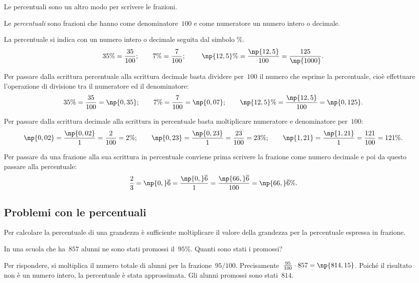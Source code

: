 Le percentuali sono un altro modo per scrivere le frazioni.

\begin{definizione}
Le \emph{percentuali} sono frazioni che hanno come denominatore~$100$ e come numeratore un numero intero o decimale.
\end{definizione}

La percentuale si indica con un numero intero o decimale seguita dal simbolo \%.
\[35\%=\frac{35}{100};\qquad7\%=\frac{7}{100};\qquad~\np{12,5}\%=\frac{\np{12,5}}{100}=\frac{125}{\np{1000}}.\]

Per passare dalla scrittura percentuale alla scrittura decimale basta dividere per~$100$ il
numero che esprime la percentuale, cioè effettuare l'operazione di divisione tra il numeratore ed il denominatore:
\[35\%=\frac{35}{100}=\np{0,35};\qquad7\%=\frac{7}{100}=\np{0,07};\qquad\np{12,5}\%=\frac{\np{12,5}}{100}=\np{0,125}.\]

Per passare dalla scrittura decimale alla scrittura in percentuale basta moltiplicare numeratore e denominatore
per~$100$:
\[\np{0,02}=\frac{\np{0,02}}{1}=\frac{2}{100}=2\%;\qquad\np{0,23}=\frac{\np{0,23}}{1}=\frac{23}{100}=23\%;
\qquad\np{1,21}=\frac{\np{1,21}}{1}=\frac{121}{100}=121\%.\]

Per passare da una frazione alla sua scrittura in percentuale conviene prima scrivere la frazione come numero decimale e poi
da questo passare alla percentuale:
\[\frac{2}{3}=\np{0,}\overline6=\frac{\np{0,}\overline6}{1}=\frac{\np{66,}\overline6}{100}=\np{66,}\overline6\%.\]

\vspazio\ovalbox{\risolvii \ref{ese:3.82}, \ref{ese:3.83}, \ref{ese:3.84}, \ref{ese:3.85}}

\subsection{Problemi con le percentuali}

Per calcolare la percentuale di una grandezza è sufficiente moltiplicare il valore
della grandezza per la percentuale espressa in frazione.

\begin{exrig}
 \begin{esempio}
In una scuola che ha~$857$ alunni ne sono stati promossi il~$95$\%. Quanti sono stati i promossi?

Per rispondere, si moltiplica il numero totale di alunni per la frazione~$95/100$.
Precisamente~$\frac{95}{100}\cdot857=\np{814,15}$.
Poiché il risultato non è un numero intero, la percentuale è stata approssimata. Gli alunni promossi sono stati~$814$.
 \end{esempio}
\end{exrig}

